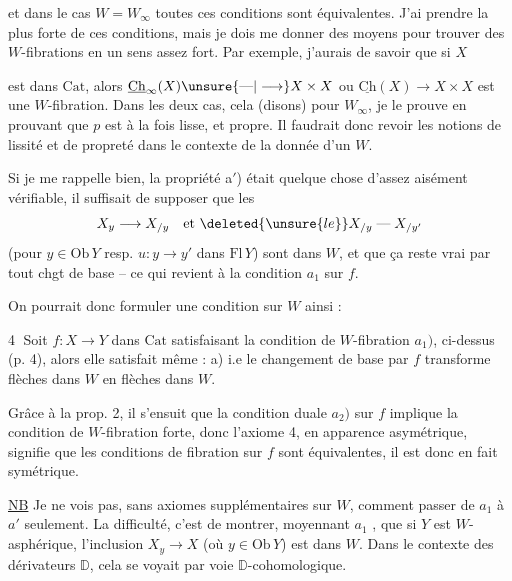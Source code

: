 et dans le cas $W=W_\infty$ toutes ces conditions sont équivalentes. J'ai  prendre la plus forte de ces conditions, mais je dois me donner des moyens pour trouver des $W$-fibrations en un sens assez fort. Par exemple, j'aurais  de savoir que si $X$


est dans $\mathrm{Cat}$, alors $\underline{\mathrm{Ch}}_\infty(X)\unsure{\text{---}|\longrightarrow}X\times X$ ou $\underline{\mathrm{Ch}}(X)\longrightarrow X\times X$ est une $W$-fibration. Dans les deux cas,  cela (disons) pour $W_\infty$, je le prouve en prouvant que $p$ est à la fois lisse, et propre. Il faudrait donc revoir les notions de lissité et de propreté dans le contexte de la donnée d'un $W$.

Si je me rappelle bien, la propriété a$'$) était quelque chose d'assez aisément vérifiable, il suffisait de supposer que les
\[
X_y\longrightarrow X_{/y}\quad\text{et }\deleted{\unsure{le}}X_{/y}\mathrel{\text{---}}X_{/y'}
\]
(pour $y\in\mathrm{Ob}\,Y$ resp. $u:y\longrightarrow y'$ dans $\mathrm{Fl}\,Y$) sont dans $W$, et que ça reste vrai par tout chgt de base -- ce qui revient  à la  condition $a_1$ sur $f$.

On pourrait donc formuler une  condition sur $W$ ainsi :


\textcircled{4}  Soit $f:X\longrightarrow Y$ dans $\mathrm{Cat}$ satisfaisant la condition de $W$-fibration $a_1)$, ci-dessus (p. 4), alors elle satisfait même : a) i.e le changement de base par $f$ transforme flèches dans $W$ en flèches dans $W$. 

Grâce à la prop. 2, il s'ensuit que la condition duale $a_2)$ sur $f$ implique la condition de $W$-fibration forte, donc l'axiome 4, en apparence asymétrique,  signifie  que les  conditions de fibration sur $f$ sont équivalentes, il est donc en fait symétrique. 

\uline{NB} Je ne vois pas, sans axiomes supplémentaires sur $W$, comment passer de $a_1$ à $a'$ seulement. La difficulté, c'est de montrer, moyennant $a_1$ , que  si $Y$ est $W$-asphérique, l'inclusion $X_y\longrightarrow X$ (où $y\in\mathrm{Ob}\,Y$) est dans $W$. Dans le contexte des dérivateurs $\mathbb{D}$, cela se voyait par voie $\mathbb{D}$-cohomologique.

